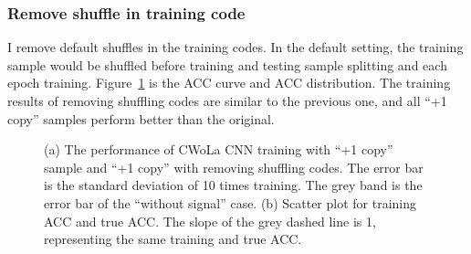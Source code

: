 \documentclass[12pt]{article}
\begin{document}
        \subsubsection{Remove shuffle in training code}%
        \label{subs:remove_shuffle_in_training_code}
            I remove default shuffles in the training codes. In the default setting, the training sample would be shuffled before training and testing sample splitting and each epoch training. Figure~\ref{fig:cwola_cnn_training_performance_copy_1_wo_shuffle_code} is the ACC curve and ACC distribution. The training results of removing shuffling codes are similar to the previous one, and all ``+1 copy'' samples perform better than the original.
            \begin{figure}[htpb]
                \centering
                \caption{(a) The performance of CWoLa CNN training with ``+1 copy'' sample and ``+1 copy'' with removing shuffling codes. The error bar is the standard deviation of 10 times training. The grey band is the error bar of the ``without signal'' case. (b) Scatter plot for training ACC and true ACC. The slope of the grey dashed line is 1, representing the same training and true ACC.}
                \label{fig:cwola_cnn_training_performance_copy_1_wo_shuffle_code}
            \end{figure}
\end{document}
